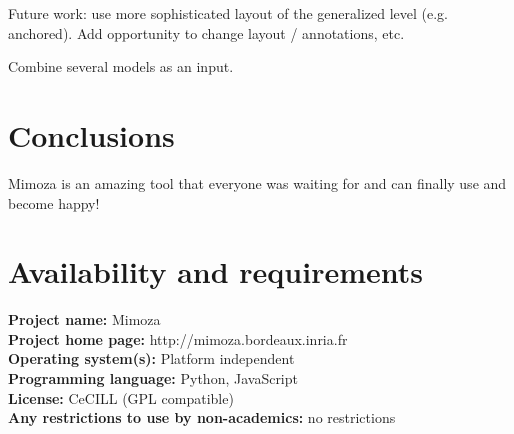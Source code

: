 \documentclass{bmcart}
\begin{document}
Future work: use more sophisticated layout of the generalized level (e.g. anchored).
Add opportunity to change layout / annotations, etc.

Combine several models as an input.

\section*{Conclusions}

Mimoza is an amazing tool that everyone was waiting for and can finally use and become happy!

\section*{Availability and requirements}
\textbf{Project name:} Mimoza\\
\textbf{Project home page:} http://mimoza.bordeaux.inria.fr\\
\textbf{Operating system(s):} Platform independent\\
\textbf{Programming language:} Python, JavaScript\\
\textbf{License:} CeCILL (GPL compatible)\\
\textbf{Any restrictions to use by non-academics:} no restrictions

\end{document}
